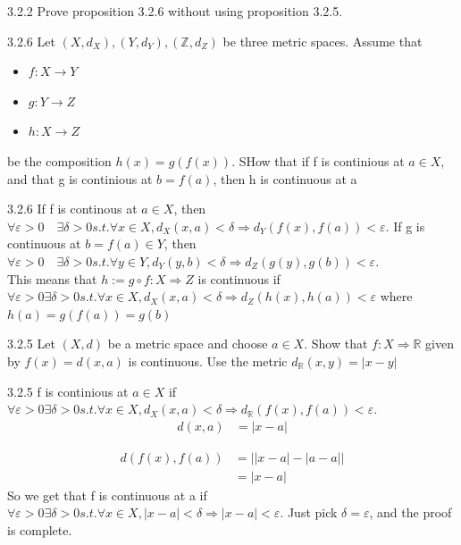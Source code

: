 \documentclass[a4paper,norsk]{article}
\renewcommand{\epsilon}{\varepsilon}
\begin{document}
\begin{oppgavebox}{3.2.2}{}
Prove proposition 3.2.6 without using proposition 3.2.5.

\begin{propositionbox}{3.2.6}{}
Let $ \left( X, d_X \right), \left( Y, d_Y \right) , \left( \mathbb{Z}, d_Z \right)   $ be three metric spaces. Assume that 
\begin{itemize}
  \item $ f: X  \rightarrow Y $ 
  \item $ g : Y  \rightarrow Z $ 
  \item $ h : X  \rightarrow Z $ 
\end{itemize}
be the composition $ h(x) = g \left( f(x) \right)  $. SHow that if f is continious at $ a \in X $, and that g is continious at  $ b = f(a) $, then h is continuous at a

\begin{proofbox}{3.2.6}{}
  If f is continous at $ a \in X $, then $ \forall \epsilon > 0 \quad \exists \delta > 0 s.t. \forall x \in X, d_X(x, a) < \delta \Rightarrow d_Y( f(x), f(a) ) < \epsilon  $. If g is continuous at $ b = f(a) \in Y $, then $ \forall \epsilon > 0 \quad \exists \delta > 0 s.t. \forall y \in Y, d_Y(y, b) < \delta \Rightarrow d_Z(g(y), g(b)) < \epsilon  $. \\

  This means that $ h :=  g \circ f : X \Rightarrow Z $ is continuous if $ \forall \epsilon > 0 \exists \delta > 0 s.t. \forall x \in X, d_X(x, a) < \delta \Rightarrow d_Z (h(x), h(a)) < \epsilon  $ where $ h(a) = g(f(a)) = g(b) $ 
\end{proofbox}
\end{propositionbox}
\end{oppgavebox}

\begin{oppgavebox}{3.2.5}{}
Let $ \left( X, d \right)  $ be a metric space and choose $ a \in X $. Show that $ f: X \Rightarrow \mathbb{R} $ given by $ f(x) = d(x, a) $ is continuous. Use the metric $ d_{ \mathbb{R}} (x, y) = \left| x - y \right|  $ 

\begin{proofbox}{3.2.5}{}
  f is continious at $ a \in X $ if $ \forall \epsilon  > 0 \exists \delta > 0 s.t. \forall x \in  X, d_X(x,a) < \delta \Rightarrow d_{ \mathbb{R}}(f(x), f(a)) < \epsilon  $. 
  \begin{align*}
    d(x, a) &= \left| x - a \right| 
  \end{align*}

  \begin{align*}
    d( f(x), f(a)) &= \left| \left| x-a \right|  - \left| a-a \right|  \right| \\
    &= \left| x-a \right| 
  \end{align*}
  So we get that f is continuous at a if $ \forall \epsilon > 0 \exists \delta > 0 s.t. \forall x \in X, \left| x-a \right| < \delta \Rightarrow \left| x-a \right| < \epsilon  $. Just pick $ \delta = \epsilon  $, and the proof is complete.
  
  
\end{proofbox}
\end{oppgavebox}
\end{document}
